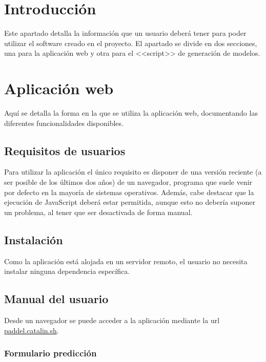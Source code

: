 \label{cha:Documentación de usuario}

\section{Introducción}

Este apartado detalla la información que un usuario deberá tener para poder
utilizar el software creado en el proyecto. El apartado se divide en dos
secciones, una para la aplicación web y otra para el <<script>> de generación de
modelos.

\section{Aplicación web}

Aquí se detalla la forma en la que se utiliza la aplicación web, documentando
las diferentes funcionalidades disponibles.

\subsection{Requisitos de usuarios}

Para utilizar la aplicación el único requisito es disponer de una versión
reciente (a ser posible de los últimos dos años) de un navegador, programa que
suele venir por defecto en la mayoría de sistemas operativos. Además, cabe
destacar que la ejecución de JavaScript deberá estar permitida, aunque esto no
debería suponer un problema, al tener que ser desactivada de forma manual.

\subsection{Instalación}

Como la aplicación está alojada en un servidor remoto, el usuario no necesita
instalar ninguna dependencia específica.

\subsection{Manual del usuario}

Desde un navegador se puede acceder a la aplicación mediante la url
\href{https://paddle.catalin.sh}{paddel.catalin.sh}.

\subsubsection{Formulario predicción}

